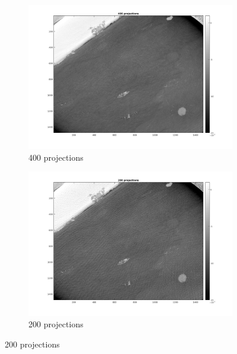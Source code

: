 \documentclass[10pt,a4paper,titlepage]{article}
\begin{document}
\begin{figure}[h!]
\begin{subfigure}[b]{0.475\textwidth}
            \centering 
            \includegraphics[width=\textwidth]{proj/400.png}  
            \caption{400 projections}
            \label{400}
        \end{subfigure}
        \quad
        \begin{subfigure}[b]{0.475\textwidth}   
            \centering 
            \includegraphics[width=\textwidth]{proj/200.png}   
            \caption{200 projections}
            \label{200}
        \end{subfigure}
        

\end{figure}
\end{document}
